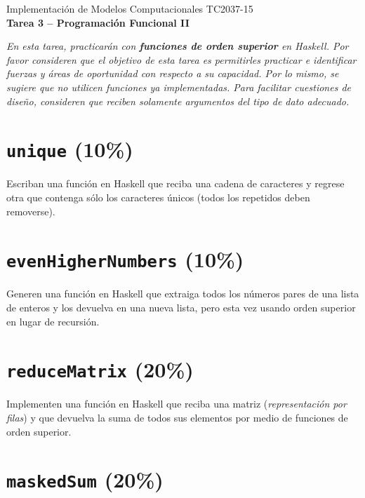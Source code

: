 \documentclass[]{article}
\theoremstyle{definition}
\begin{document}
\begin{center}
{\huge Implementación de Modelos Computacionales TC2037-15}\\[1.5ex]
{\large \textbf{Tarea 3 -- Programación Funcional II}\\[1.5ex] %
} %
\end{center}

\vspace{0.2 cm}

{\footnotesize \textit{En esta tarea, practicarán con \textbf{funciones de orden superior} en Haskell. Por favor consideren que el objetivo de esta tarea es permitirles practicar e identificar fuerzas y áreas de oportunidad con respecto a su capacidad. Por lo mismo, se sugiere que no utilicen funciones ya implementadas. Para facilitar cuestiones de diseño, consideren que reciben solamente argumentos del tipo de dato adecuado.}}

\section{\texttt{unique} (10\%)}

Escriban una función en Haskell que reciba una cadena de caracteres y regrese otra que contenga sólo los caracteres únicos (todos los repetidos deben removerse).

\section{\texttt{evenHigherNumbers} (10\%)}

Generen una función en Haskell que extraiga todos los números pares de una lista de enteros y los devuelva en una nueva lista, pero esta vez usando orden superior en lugar de recursión.

\section{\texttt{reduceMatrix} (20\%)}

Implementen una función en Haskell que reciba una matriz (\textit{representación por filas}) y que devuelva la suma de todos sus elementos por medio de funciones de orden superior.

\section{\texttt{maskedSum} (20\%)}
\end{document}
